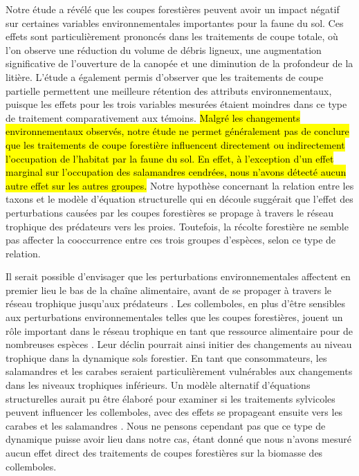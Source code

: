 Notre étude a révélé que les coupes forestières peuvent avoir un impact négatif sur certaines variables environnementales importantes pour la faune du sol. 
Ces effets sont particulièrement prononcés dans les traitements de coupe totale, où l'on observe une réduction du volume de débris ligneux, une augmentation significative de l'ouverture de la canopée et une diminution de la profondeur de la litière. 
L'étude a également permis d'observer que les traitements de coupe partielle permettent une meilleure rétention des attributs environnementaux, puisque les effets pour les trois variables mesurées étaient moindres dans ce type de traitement comparativement aux témoins.
\hl{Malgré les changements environnementaux observés, notre étude ne permet généralement pas de conclure que les traitements de coupe forestière influencent directement ou indirectement l’occupation de l’habitat par la faune du sol. En effet, à l’exception d’un effet marginal sur l’occupation des salamandres cendrées, nous n’avons détecté aucun autre effet sur les autres groupes. 
}Notre hypothèse concernant la relation entre les taxons et le modèle d'équation structurelle qui en découle suggérait que l'effet des perturbations causées par les coupes forestières se propage à travers le réseau trophique des prédateurs vers les proies. 
Toutefois, la récolte forestière ne semble pas affecter la cooccurrence entre ces trois groupes d'espèces, selon ce type de relation. 

Il serait possible d'envisager que les perturbations environnementales affectent en premier lieu le bas de la chaîne alimentaire, avant de se propager à travers le réseau trophique jusqu'aux prédateurs \citep{Chauvat2014Responsesoil,Laigle2021Directindirect}. 
Les collemboles, en plus d'être sensibles aux perturbations environnementales telles que les coupes forestières, jouent un rôle important dans le réseau trophique en tant que ressource alimentaire pour de nombreuses espèces \citep{Burton1975Energyflow,Bauer1982Predationcarabid,rusekBiodiversityCollembolaTheir1998,Chauvat2014Responsesoil}. 
Leur déclin pourrait ainsi initier des changements au niveau trophique dans la dynamique sols forestier.
En tant que consommateurs, les salamandres et les carabes seraient particulièrement vulnérables aux changements dans les niveaux trophiques inférieurs. 
Un modèle alternatif d'équations structurelles aurait pu être élaboré pour examiner si les traitements sylvicoles peuvent influencer les collemboles, avec des effets se propageant ensuite vers les carabes et les salamandres \citep{Laigle2021Directindirect}. 
Nous ne pensons cependant pas que ce type de dynamique puisse avoir lieu dans notre cas, étant donné que nous n'avons mesuré aucun effet direct des traitements de coupes forestières sur la biomasse des collemboles. 

